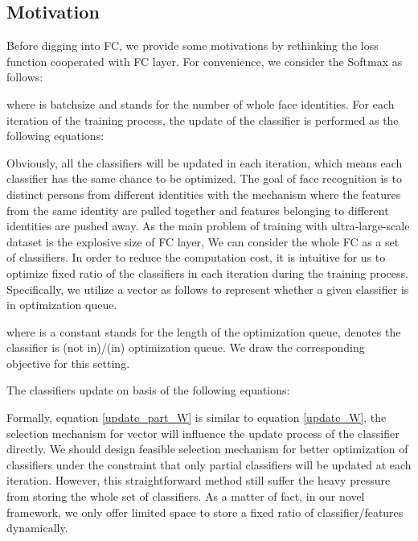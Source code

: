 \subsection{Motivation}
Before digging into FC, we provide some motivations by rethinking the loss function cooperated with FC layer.
For convenience, we consider the Softmax as follows:

where  is batchsize and  stands for the number of whole face identities.
For each iteration of the training process, the update of the classifier  is performed as the following equations:

Obviously, all the classifiers  will be updated in each iteration, which means each classifier has the same chance to be optimized.
The goal of face recognition is to distinct persons from different identities with the mechanism where the features from the same identity are pulled together and features belonging to different identities are pushed away.
As the main problem of training with ultra-large-scale dataset is the explosive size of FC layer,
We can consider the whole FC as a set of classifiers.
In order to reduce the computation cost, it is intuitive for us to optimize fixed ratio of the classifiers in each iteration during the training process.
Specifically, we utilize a vector as follows to represent whether a given classifier is in optimization queue.

where  is a constant stands for the length of the optimization queue,  denotes the classifier  is (not in)/(in) optimization queue.
We draw the corresponding objective for this setting.

The classifiers update on basis of the following equations: 

Formally, equation \ref{update_part_W} is similar to equation \ref{update_W}, the selection mechanism for vector  will influence the update process of the classifier directly.
We should design feasible selection mechanism for better optimization of classifiers under the constraint that only partial classifiers will be updated at each iteration.
However, this straightforward method still suffer the heavy pressure from storing the whole set of classifiers.
As a matter of fact, in our novel framework, we only offer limited space to store a fixed ratio of classifier/features dynamically.
